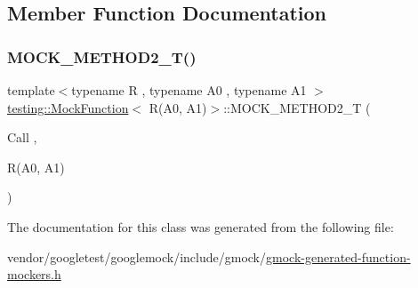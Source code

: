 \subsection{Member Function Documentation}
\mbox{\label{classtesting_1_1_mock_function_3_01_r_07_a0_00_01_a1_08_4_a5a4d673a3252cab866f0a4fa97486190}} 
\subsubsection{\texorpdfstring{M\+O\+C\+K\+\_\+\+M\+E\+T\+H\+O\+D2\+\_\+\+T()}{MOCK\_METHOD2\_T()}}
{\footnotesize\ttfamily template$<$typename R , typename A0 , typename A1 $>$ \\
\hyperlink{classtesting_1_1_mock_function}{testing\+::\+Mock\+Function}$<$ R(A0, A1)$>$\+::M\+O\+C\+K\+\_\+\+M\+E\+T\+H\+O\+D2\+\_\+T (\begin{DoxyParamCaption}\item[{Call}]{,  }\item[{R(A0, A1)}]{ }\end{DoxyParamCaption})}



The documentation for this class was generated from the following file\+:\begin{DoxyCompactItemize}
\item 
vendor/googletest/googlemock/include/gmock/\hyperlink{gmock-generated-function-mockers_8h}{gmock-\/generated-\/function-\/mockers.\+h}\end{DoxyCompactItemize}
